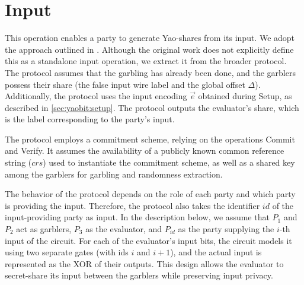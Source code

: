 \section{Input}

This operation enables a party to generate Yao-shares from its input. We adopt the approach outlined in \cite{CCS:MohRosZha15}. Although the original work does not explicitly define this as a standalone input operation, we extract it from the broader protocol. The protocol assumes that the garbling has already been done, and the garblers possess their share (the false input wire label and the global offset $\Delta$). Additionally, the protocol uses the input encoding $\vec{e}$ obtained during Setup, as described in \ref{sec:yaobit:setup}. The protocol outputs the evaluator's share, which is the label corresponding to the party's input.

The protocol employs a commitment scheme, relying on the operations \textsf{Commit} and \textsf{Verify}. It assumes the availability of a publicly known common reference string ($crs$) used to instantiate the commitment scheme, as well as a shared key among the garblers for garbling and randomness extraction.

The behavior of the protocol depends on the role of each party and which party is providing the input. Therefore, the protocol also takes the identifier $id$ of the input-providing party as input. In the description below, we assume that $P_1$ and $P_2$ act as garblers, $P_3$ as the evaluator, and $P_{id}$ as the party supplying the $i$-th input of the circuit. For each of the evaluator's input bits, the circuit models it using two separate gates (with ids $i$ and $i+1$), and the actual input is represented as the XOR of their outputs. This design allows the evaluator to secret-share its input between the garblers while preserving input privacy.

